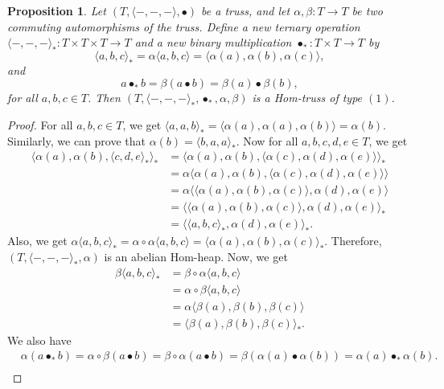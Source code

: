 \documentclass[14pt]{article}
\newtheorem{prop}[thm]{Proposition}
\theoremstyle{Definition}
\theoremstyle{remark}
\begin{document}
\begin{prop}\label{Prop2}
Let $(T,\langle-,-,-\rangle,\bullet)$ be a truss, and let $\alpha, \beta : T \to T$ be two commuting automorphisms of the truss.  
Define a new ternary operation $\langle-,-,-\rangle_{\ast} : T \times T \times T \to T$ and a new binary multiplication $\bullet_{\ast} : T \times T \to T$ by  
\[
\langle a,b,c\rangle_{\ast} = \alpha\langle a,b,c\rangle = \langle\alpha(a),\alpha(b),\alpha(c)\rangle,
\]
and  
\[
a \bullet_{\ast} b = \beta(a \bullet b) = \beta(a) \bullet \beta(b),
\]
for all $a,b,c \in T$. Then $(T, \langle-,-,-\rangle_{\ast}, \bullet_{\ast}, \alpha, \beta)$ is a Hom-truss of type $(1)$.
\end{prop}
\begin{proof}
For all $a,b,c\in T$, we get $\langle a,a,b\rangle_{\ast}=\langle\alpha(a),\alpha(a),\alpha(b)\rangle=\alpha(b)$. Similarly, we can prove that $\alpha(b)=\langle b,a,a\rangle_{\ast}$. Now for all $a,b,c,d,e\in T$, we get 
\begin{align*}
\langle\alpha(a),\alpha(b),\langle c,d,e\rangle_{\ast}\rangle_{\ast}&=\langle\alpha(a),\alpha(b),\langle\alpha(c),\alpha(d),\alpha(e)\rangle\rangle_{\ast}\\
&=\alpha\langle\alpha(a),\alpha(b),\langle\alpha(c),\alpha(d),\alpha(e)\rangle\rangle\\
&=\alpha\langle\langle\alpha(a),\alpha(b),\alpha(c)\rangle,\alpha(d),\alpha(e)\rangle\\
&=\langle\langle\alpha(a),\alpha(b),\alpha(c)\rangle,\alpha(d),\alpha(e)\rangle_{\ast}\\
&=\langle\langle a,b,c\rangle_{\ast},\alpha(d),\alpha(e)\rangle_{\ast}.
\end{align*}
Also, we get $\alpha\langle a,b,c\rangle_{\ast}=\alpha\circ\alpha\langle a,b,c\rangle=\langle\alpha(a),\alpha(b),\alpha(c)\rangle_{\ast}$. Therefore, $(T,\langle-,-,-\rangle_{\ast},\alpha)$ is an abelian Hom-heap.
Now, we get
\begin{align*}
\beta\langle a,b,c\rangle_{\ast}&=\beta\circ\alpha\langle a,b,c\rangle\\
&=\alpha\circ\beta\langle a,b,c\rangle\\
&=\alpha\langle\beta(a),\beta(b),\beta(c)\rangle\\
&=\langle\beta(a),\beta(b),\beta(c)\rangle_{\ast}.
\end{align*}
We also have
\begin{align*}
&\alpha(a\bullet_{\ast}b)=\alpha\circ\beta(a\bullet b)=\beta\circ\alpha(a\bullet b)=\beta(\alpha(a)\bullet\alpha(b))=\alpha(a)\bullet_{\ast}\alpha(b).\\

\end{align*}
\end{proof}
\end{document}
